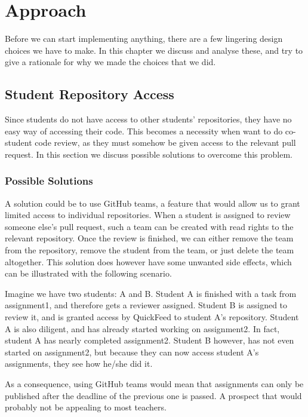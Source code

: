 
\chapter{Approach}
\label{ch:approach}

Before we can start implementing anything, there are a few lingering design choices we have to make.
In this chapter we discuss and analyse these, and try to give a rationale for why we made the choices that we did.

\section{Student Repository Access}

Since students do not have access to other students' repositories, they have no easy way of accessing their code.
This becomes a necessity when want to do co-student code review, as they must somehow be given access to the relevant pull request.
In this section we discuss possible solutions to overcome this problem.

\subsection{Possible Solutions}

A solution could be to use GitHub teams, a feature that would allow us to grant limited access to individual repositories.
When a student is assigned to review someone else's pull request, such a team can be created with read rights to the relevant repository.
Once the review is finished, we can either remove the team from the repository, remove the student from the team, or just delete the team altogether.
This solution does however have some unwanted side effects, which can be illustrated with the following scenario.

Imagine we have two students: A and B.
Student A is finished with a task from assignment1, and therefore gets a reviewer assigned.
Student B is assigned to review it, and is granted access by QuickFeed to student A's repository.
Student A is also diligent, and has already started working on assignment2.
In fact, student A has nearly completed assignment2.
Student B however, has not even started on assignment2, but because they can now access student A's assignments, they see how he/she did it.

As a consequence, using GitHub teams would mean that assignments can only be published after the deadline of the previous one is passed.
A prospect that would probably not be appealing to most teachers.

